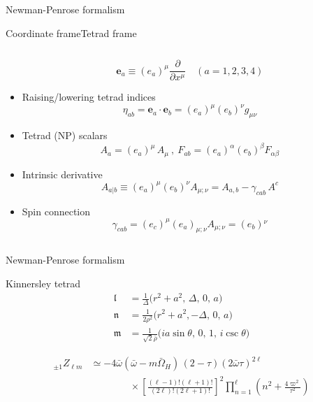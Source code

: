 \documentclass[9pt,serif,mathserif]{beamer}
\newcommand{\uu}[3][]{ {}_{#1} #2_{#3} }
\begin{document}
\begin{frame}{Newman-Penrose formalism}
\begin{block}{\hspace{1.0cm}\alert{Coordinate frame}\hspace{3.5cm}\alert{Tetrad frame}}
\begin{columns}[T,onlytextwidth]
\begin{column}{0.5\textwidth}
\begin{itemize}
                    $$ \bm{e}_a \equiv (e_a)^\mu \frac{\partial}{\partial x^\mu} \quad (a = 1,2,3,4)$$
                    \item Raising/lowering tetrad indices
                    $$\eta_{ab} = \bm{e}_a \cdot \bm{e}_b = (e_a)^\mu (e_b)^\nu g_{\mu\nu} $$
                    \item Tetrad (NP) scalars
                    $$ A_a = (e_a)^\mu \,A_\mu ~,~ F_{ab} = (e_a)^\alpha (e_b)^\beta F_{\alpha\beta} $$
                    \item Intrinsic derivative
                    $$ A_{a|b} \equiv (e_a)^\mu (e_b)^\nu A_{\mu;\nu} = A_{a,b} - \gamma_{cab} \,A^c $$
                    \item Spin connection
                    $$\gamma_{cab} = (e_c)^\mu (e_a)_{\mu;\nu} A_{\mu;\nu} = (e_b){}^\nu$$
                \end{itemize}
            \end{column}
        \end{columns}
        \vspace{0.15cm}
    \end{block}
\end{frame}

\begin{frame}{Newman-Penrose formalism}
    \begin{block}{Kinnersley tetrad}
        \begin{align*}
            \bm{\mathfrak{l}} &= \frac{1}{\Delta} \Big( r^2+a^2, \,\Delta, \,0, \,a \Big) \\
            \bm{\mathfrak{n}} &= \frac{1}{2 \rho^2} \Big( r^2+a^2, -\Delta, \,0, \,a \Big)\\
            \bm{\mathfrak{m}} &= \frac{1}{\sqrt{2} \bar{\rho}} \Big( i a \sin\theta, \,0, \,1, \,i \csc\theta \Big)
        \end{align*}
    \end{block}
    \begin{align*}
        \uu[\pm1]{Z}{\ell m} &\simeq  - 4 \bar{\omega} (\bar{\omega} - m \bar{\Omega}_H) \,(2-\tau)(2\bar{\omega} \tau)^{2\ell} \\
        & \qquad\qquad \times \left[\frac{(\ell-1)! (\ell+1)!}{(2\ell)! (2\ell+1)!}\right]^2 \prod_{n=1}^{\ell}\left(n^2 + \frac{4 \varpi^2}{\tau^2} \right)
    \end{align*}
\end{frame}
\end{document}
